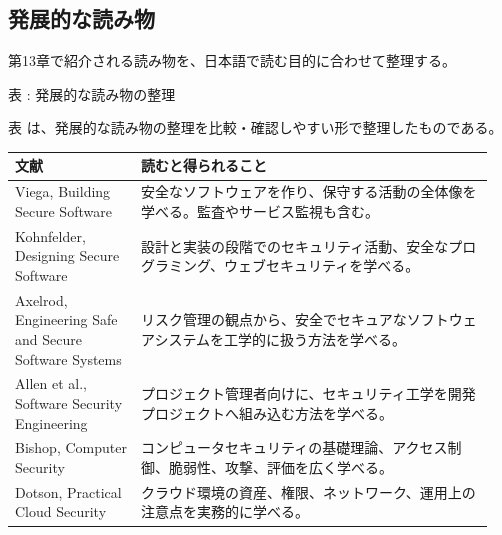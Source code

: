 \subsection{発展的な読み物}
第13章で紹介される読み物を、日本語で読む目的に合わせて整理する。

\par\smallskip\noindent{}\label{tab:ch13-07}表 \thetable: 発展的な読み物の整理\par\smallskip
表 \thetable は、発展的な読み物の整理を比較・確認しやすい形で整理したものである。\par\smallskip
\begin{longtable}{>{\raggedright\arraybackslash}p{0.25\linewidth}>{\raggedright\arraybackslash}p{0.7\linewidth}}
\toprule
文献 & 読むと得られること \\
\midrule
\endhead
Viega, Building Secure Software & 安全なソフトウェアを作り、保守する活動の全体像を学べる。監査やサービス監視も含む。 \\
Kohnfelder, Designing Secure Software & 設計と実装の段階でのセキュリティ活動、安全なプログラミング、ウェブセキュリティを学べる。 \\
Axelrod, Engineering Safe and Secure Software Systems & リスク管理の観点から、安全でセキュアなソフトウェアシステムを工学的に扱う方法を学べる。 \\
Allen et al., Software Security Engineering & プロジェクト管理者向けに、セキュリティ工学を開発プロジェクトへ組み込む方法を学べる。 \\
Bishop, Computer Security & コンピュータセキュリティの基礎理論、アクセス制御、脆弱性、攻撃、評価を広く学べる。 \\
Dotson, Practical Cloud Security & クラウド環境の資産、権限、ネットワーク、運用上の注意点を実務的に学べる。 \\
\bottomrule
\end{longtable}
